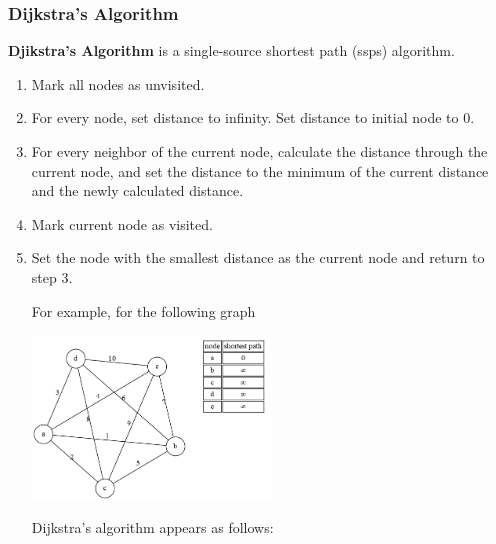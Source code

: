 \documentclass[a4paper]{article}
\theoremstyle{definition}
\begin{document}
\subsubsection{Dijkstra's Algorithm}
\textbf{Djikstra's Algorithm} is a single-source shortest path (ssps) algorithm. 
\begin{enumerate}
 \item Mark all nodes as unvisited. 
 \item For every node, set distance to infinity. Set distance to initial node to 0.
 \item For every neighbor of the current node, calculate the distance through the current node, and set the distance to the minimum of the current distance and the newly calculated distance.
 \item Mark current node as visited. 
 \item Set the node with the smallest distance as the current node and return to step 3.
 
 For example, for the following graph
 
 \begin{center}\includegraphics[width=0.5\textwidth]{graphs/shortest-path-trees/spt_1_0.png}\end{center}
 
 Dijkstra's algorithm appears as follows:


\end{enumerate}
\end{document}
